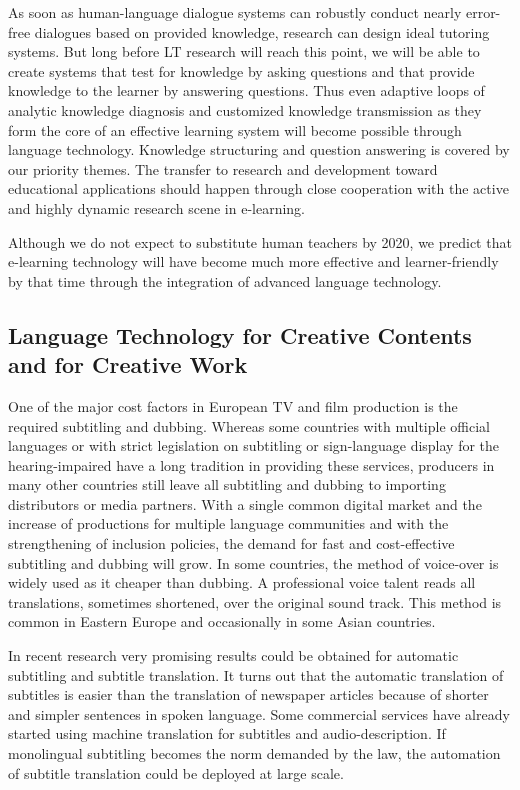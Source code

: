 \documentclass[10pt, plain]{../../metanetpaper}
\begin{document}
\begin{multicols}{2}
As soon as human-language dialogue systems can robustly conduct nearly error-free dialogues based on provided knowledge, research can design ideal tutoring systems. But long before LT research will reach this point, we will be able to create systems that test for knowledge by asking questions and that provide knowledge to the learner by answering questions. Thus even adaptive loops of analytic knowledge diagnosis and customized knowledge transmission as they form the core of an effective learning system will become possible through language technology. Knowledge structuring and question answering is covered by our priority themes. The transfer to research and development toward educational applications should happen through close cooperation with the active and highly dynamic research scene in e-learning.
 
Although we do not expect to substitute human teachers by 2020, we predict that e-learning technology will have become much more effective and learner-friendly by that time through the integration of advanced language technology.

\subsection{Language Technology for Creative Contents and for Creative Work}
\label{sec:lt-creative-contents}

One of the major cost factors in European TV and film production is the required subtitling and dubbing. Whereas some countries with multiple official languages or with strict legislation on subtitling or sign-language display for the hearing-impaired have a long tradition in providing these services, producers in many other countries still leave all subtitling and dubbing to importing distributors or media partners. With a single common digital market and the increase of productions for multiple language communities and with the strengthening of inclusion policies, the demand for fast and cost-effective subtitling and dubbing will grow. In some countries, the method of voice-over is widely used as it cheaper than dubbing. A professional voice talent reads all translations, sometimes shortened, over the original sound track. This method is common in Eastern Europe and occasionally in some Asian countries. 
 
In recent research very promising results could be obtained for automatic subtitling and subtitle translation. It turns out that the automatic translation of subtitles is easier than the translation of newspaper articles because of shorter and simpler sentences in spoken language. Some commercial services have already started using machine translation for subtitles and audio-description. If monolingual subtitling becomes the norm demanded by the law, the automation of subtitle translation could be deployed at large scale.
 

\end{multicols}
\end{document}

